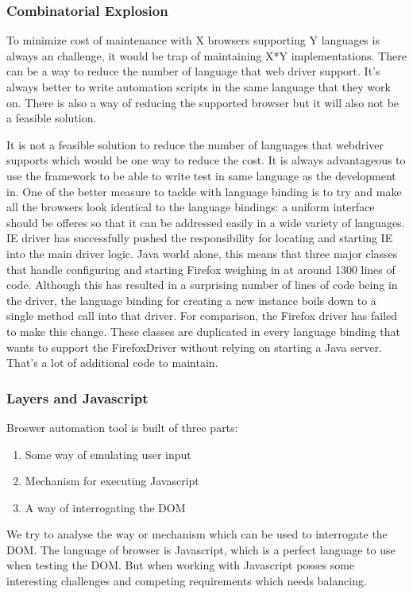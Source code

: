 \documentclass[article,type=msc,colorback,accentcolor=tud9c,twoside,11pt]{tudthesis}
\begin{document}
\subsubsection{Combinatorial Explosion}
To minimize cost of maintenance with X browsers supporting Y languages is always an challenge, it would be trap of maintaining X*Y implementations. There can be a way to reduce the number of language that web driver support. It's always better to write automation scripts in the same language that they work on. There is also a way of reducing the supported browser but it will also not be a feasible solution.

It is not a feasible solution to reduce the number of languages that webdriver supports which would be one way to reduce the cost. It is always advantageous to use the framework to be able to write test in same language as the development in. One of the better measure to tackle with language binding is to try and make all the browsers look identical to the language bindings: a uniform interface should be offeres so that it can be addressed easily in a wide variety of languages. IE driver has successfully pushed the responsibility for locating and starting IE into the main driver logic. Java world alone, this means that three major classes that handle configuring and starting Firefox weighing in at around 1300 lines of code. Although this has resulted in a surprising number of lines of code being in the driver, the language binding for creating a new instance boils down to a single method call into that driver. For comparison, the Firefox driver has failed to make this change. These classes are duplicated in every language binding that wants to support the FirefoxDriver without relying on starting a Java server. That's a lot of additional code to maintain.

\subsubsection{Layers and Javascript}
Broswer automation tool is built of three parts:
\begin{enumerate}
	\item Some way of emulating user input
	\item Mechanism for executing Javascript
	\item A way of interrogating the DOM
\end{enumerate}
We try to analyse the way or mechanism which can be used to interrogate the DOM. The language of browser is Javascript, which is a perfect language to use when testing the DOM. But when working with Javascript posses some interesting challenges and competing requirements which needs balancing.
\end{document}
